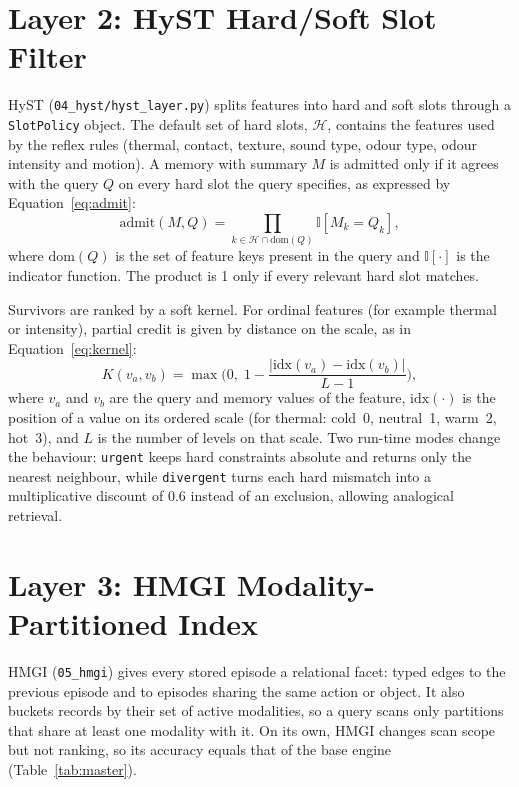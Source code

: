 \documentclass[12pt,a4paper,oneside]{report}
\newcommand{\code}[1]{\texttt{\small #1}}
\begin{document}
\section{Layer 2: HyST Hard/Soft Slot Filter}\label{sec:hyst}
HyST (\code{04\_hyst/hyst\_layer.py}) splits features into hard and soft slots through a \code{SlotPolicy} object. The default set of hard slots, $\mathcal{H}$, contains the features used by the reflex rules (thermal, contact, texture, sound type, odour type, odour intensity and motion). A memory with summary $M$ is admitted only if it agrees with the query $Q$ on every hard slot the query specifies, as expressed by Equation~\eqref{eq:admit}:
\begin{equation}
  \mathrm{admit}(M, Q) = \prod_{k \in \mathcal{H} \cap \mathrm{dom}(Q)} \mathbb{I}\left[M_k = Q_k\right],
  \label{eq:admit}
\end{equation}
where $\mathrm{dom}(Q)$ is the set of feature keys present in the query and $\mathbb{I}[\cdot]$ is the indicator function. The product is 1 only if every relevant hard slot matches.

Survivors are ranked by a soft kernel. For ordinal features (for example thermal or intensity), partial credit is given by distance on the scale, as in Equation~\eqref{eq:kernel}:
\begin{equation}
  K(v_a, v_b) = \max\Big(0,\; 1 - \frac{|\mathrm{idx}(v_a) - \mathrm{idx}(v_b)|}{L - 1}\Big),
  \label{eq:kernel}
\end{equation}
where $v_a$ and $v_b$ are the query and memory values of the feature, $\mathrm{idx}(\cdot)$ is the position of a value on its ordered scale (for thermal: cold~0, neutral~1, warm~2, hot~3), and $L$ is the number of levels on that scale. Two run-time modes change the behaviour: \code{urgent} keeps hard constraints absolute and returns only the nearest neighbour, while \code{divergent} turns each hard mismatch into a multiplicative discount of $0.6$ instead of an exclusion, allowing analogical retrieval.

\section{Layer 3: HMGI Modality-Partitioned Index}
HMGI (\code{05\_hmgi}) gives every stored episode a relational facet: typed edges to the previous episode and to episodes sharing the same action or object. It also buckets records by their set of active modalities, so a query scans only partitions that share at least one modality with it. On its own, HMGI changes scan scope but not ranking, so its accuracy equals that of the base engine (Table~\ref{tab:master}).
\end{document}
